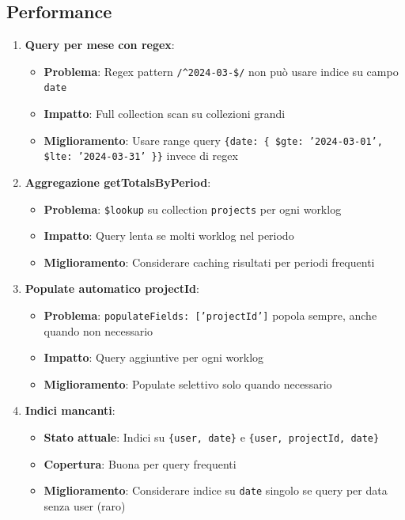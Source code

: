 \documentclass[11pt,a4paper]{article}
\begin{document}
\subsection{Performance}

\begin{enumerate}
    \item \textbf{Query per mese con regex}:
    \begin{itemize}
        \item \textbf{Problema}: Regex pattern \texttt{/^2024-03-\$/} non può usare indice su campo \texttt{date}
        \item \textbf{Impatto}: Full collection scan su collezioni grandi
        \item \textbf{Miglioramento}: Usare range query \texttt{\{date: \{ \$gte: '2024-03-01', \$lte: '2024-03-31' \}\}} invece di regex
    \end{itemize}
    
    \item \textbf{Aggregazione getTotalsByPeriod}:
    \begin{itemize}
        \item \textbf{Problema}: \texttt{\$lookup} su collection \texttt{projects} per ogni worklog
        \item \textbf{Impatto}: Query lenta se molti worklog nel periodo
        \item \textbf{Miglioramento}: Considerare caching risultati per periodi frequenti
    \end{itemize}
    
    \item \textbf{Populate automatico projectId}:
    \begin{itemize}
        \item \textbf{Problema}: \texttt{populateFields: ['projectId']} popola sempre, anche quando non necessario
        \item \textbf{Impatto}: Query aggiuntive per ogni worklog
        \item \textbf{Miglioramento}: Populate selettivo solo quando necessario
    \end{itemize}
    
    \item \textbf{Indici mancanti}:
    \begin{itemize}
        \item \textbf{Stato attuale}: Indici su \texttt{\{user, date\}} e \texttt{\{user, projectId, date\}}
        \item \textbf{Copertura}: Buona per query frequenti
        \item \textbf{Miglioramento}: Considerare indice su \texttt{date} singolo se query per data senza user (raro)
    \end{itemize}
\end{enumerate}
\end{document}
